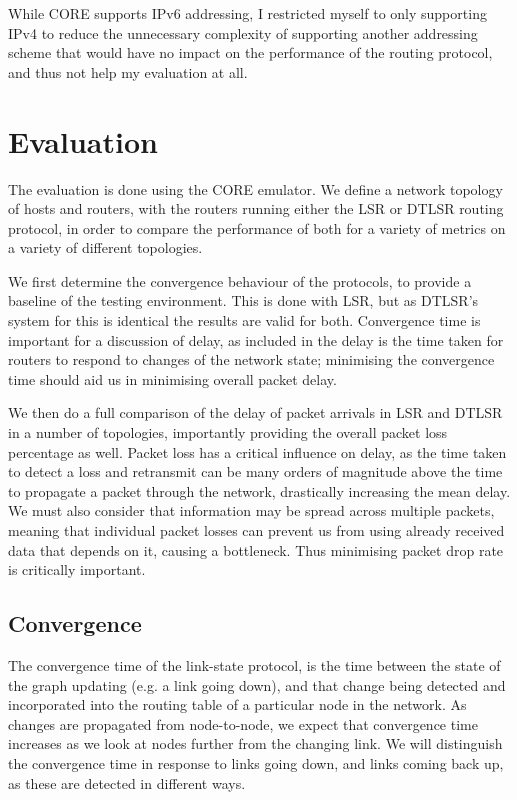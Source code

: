\documentclass[withindex,glossary,openany]{cam-thesis}
\begin{document}
While CORE supports IPv6 addressing, I restricted myself to only supporting IPv4 to reduce the unnecessary complexity of supporting another addressing scheme that would have no impact on the performance of the routing protocol, and thus not help my evaluation at all.


\chapter{Evaluation}

The evaluation is done using the CORE emulator. We define a network topology of hosts and routers, with the routers running either the LSR or DTLSR routing protocol, in order to compare the performance of both for a variety of metrics on a variety of different topologies.

We first determine the convergence behaviour of the protocols, to provide a baseline of the testing environment. This is done with LSR, but as DTLSR's system for this is identical the results are valid for both. Convergence time is important for a discussion of delay, as included in the delay is the time taken for routers to respond to changes of the network state; minimising the convergence time should aid us in minimising overall packet delay.

We then do a full comparison of the delay of packet arrivals in LSR and DTLSR in a number of topologies, importantly providing the overall packet loss percentage as well. Packet loss has a critical influence on delay, as the time taken to detect a loss and retransmit can be many orders of magnitude above the time to propagate a packet through the network, drastically increasing the mean delay. We must also consider that information may be spread across multiple packets, meaning that individual packet losses can prevent us from using already received data that depends on it, causing a bottleneck. Thus minimising packet drop rate is critically important.

\section{Convergence}

The convergence time of the link-state protocol, is the time between the state of the graph updating (e.g. a link going down), and that change being detected and incorporated into the routing table of a particular node in the network. As changes are propagated from node-to-node, we expect that convergence time increases as we look at nodes further from the changing link. We will distinguish the convergence time in response to links going down, and links coming back up, as these are detected in different ways. 
\end{document}
